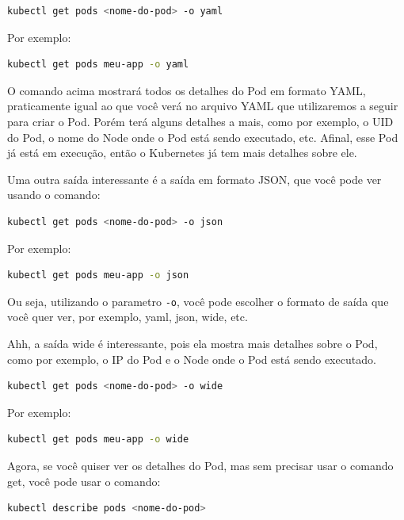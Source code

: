 \documentclass[12pt,a4paper]{article}
\begin{document}
\begin{lstlisting}[language=bash]
kubectl get pods <nome-do-pod> -o yaml
\end{lstlisting}

Por exemplo:

\begin{lstlisting}[language=bash]
kubectl get pods meu-app -o yaml
\end{lstlisting}

O comando acima mostrará todos os detalhes do Pod em formato YAML, praticamente igual ao que você verá no arquivo YAML que utilizaremos a seguir para criar o Pod. Porém terá alguns detalhes a mais, como por exemplo, o UID do Pod, o nome do Node onde o Pod está sendo executado, etc. Afinal, esse Pod já está em execução, então o Kubernetes já tem mais detalhes sobre ele.

Uma outra saída interessante é a saída em formato JSON, que você pode ver usando o comando:

\begin{lstlisting}[language=bash]
kubectl get pods <nome-do-pod> -o json
\end{lstlisting}

Por exemplo:

\begin{lstlisting}[language=bash]
kubectl get pods meu-app -o json
\end{lstlisting}

Ou seja, utilizando o parametro \texttt{-o}, você pode escolher o formato de saída que você quer ver, por exemplo, yaml, json, wide, etc.

Ahh, a saída wide é interessante, pois ela mostra mais detalhes sobre o Pod, como por exemplo, o IP do Pod e o Node onde o Pod está sendo executado.

\begin{lstlisting}[language=bash]
kubectl get pods <nome-do-pod> -o wide
\end{lstlisting}

Por exemplo:

\begin{lstlisting}[language=bash]
kubectl get pods meu-app -o wide
\end{lstlisting}

Agora, se você quiser ver os detalhes do Pod, mas sem precisar usar o comando get, você pode usar o comando:

\begin{lstlisting}[language=bash]
kubectl describe pods <nome-do-pod>
\end{lstlisting}
\end{document}
